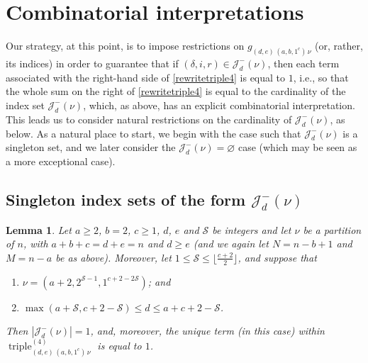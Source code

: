 \documentclass[12pt]{article}
\newtheorem{lemma}{Lemma}%
\begin{document}
\section{Combinatorial interpretations}\label{secinter}
 Our strategy, at this point, is to impose restrictions on $g_{(d, e) \, (a, b, 1^c) \, \nu} $ (or, rather, its indices) in order to guarantee that if 
 $(\delta, i, r) \in \mathcal{J}^{-}_{d}(\nu)$, then each term associated with the right-hand side of \eqref{rewritetriple4} is equal to $1$, i.e., 
 so that the whole sum on the right of \eqref{rewritetriple4} is equal to the cardinality of the index set $\mathcal{J}^{-}_{d}(\nu)$, which, 
 as above, has an explicit combinatorial interpretation. This leads us to consider natural restrictions on the cardinality of 
 $\mathcal{J}_{d}^{-}(\nu)$, as below. As a natural place to start, we begin with the case such that $\mathcal{J}_{d}^{-}(\nu)$ is a 
 singleton set, and we later consider the $\mathcal{J}_{d}^{-}(\nu) = \varnothing$ case (which may be seen as a more exceptional case). 

\subsection{Singleton index sets of the form $\mathcal{J}_{d}^{-}(\nu)$}

\begin{lemma}\label{Lemsize1}
 Let $a \geq 2$, $b = 2$, $c \geq 1$, $d$, $e$ and $\mathcal{S}$ be integers and let $\nu$ be a partition of $n$, with $a+b+c = d + e = 
 n$ and $d \geq e$ (and we again let $N = n - b + 1$ and $M = n - a$ be as above). Moreover, let $1 \leq \mathcal{S} \leq \lfloor 
 \frac{c+2}{2} \rfloor$, and suppose that 
\begin{enumerate}

\item $\nu = (a+2, 2^{\mathcal{S}-1}, 1^{c+2-2\mathcal{S}})$; and 

\item $\max(a + \mathcal{S}, c + 2 - \mathcal{S}) \leq d \leq a + c + 2 -\mathcal{S}$.

\end{enumerate}

\noindent Then $\left| \mathcal{J}_{d}^{-}(\nu) \right| = 1$, and, moreover, the unique term (in this case) within
 $ \operatorname{triple}_{(d, e) \, (a, b, 1^c) \, \nu}^{(4)}$ is equal to $1$. 
\end{lemma}
\end{document}
